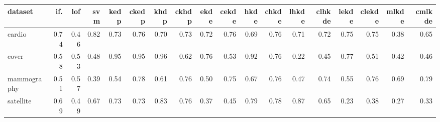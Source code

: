 \begin{tabular}{lrrrrrrrrrrrrrrrrr}
  \hline
dataset & if. & lof & svm & kedp & ckedp & khdp & ckhdp & ekde & cekde & hkde & chkde & lhkde & clhkde & lekde & clekde & mlkde & cmlkde \\ 
  \hline
cardio & 0.74 & 0.46 & 0.82 & 0.73 & 0.76 & 0.70 & 0.73 & 0.72 & 0.76 & 0.69 & 0.76 & 0.71 & 0.72 & 0.75 & 0.75 & 0.38 & 0.65 \\ 
  cover & 0.58 & 0.53 & 0.48 & 0.95 & 0.95 & 0.96 & 0.62 & 0.76 & 0.53 & 0.92 & 0.76 & 0.22 & 0.45 & 0.77 & 0.51 & 0.42 & 0.46 \\ 
  mammography & 0.51 & 0.57 & 0.39 & 0.54 & 0.78 & 0.61 & 0.76 & 0.50 & 0.75 & 0.67 & 0.76 & 0.47 & 0.74 & 0.55 & 0.76 & 0.69 & 0.79 \\ 
  satellite & 0.69 & 0.49 & 0.67 & 0.73 & 0.73 & 0.83 & 0.76 & 0.37 & 0.45 & 0.79 & 0.78 & 0.87 & 0.65 & 0.23 & 0.38 & 0.27 & 0.33 \\ 
   \hline
\end{tabular}

